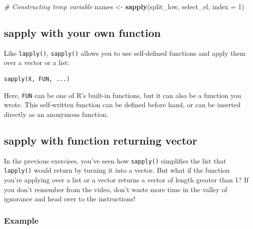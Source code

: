 \documentclass[
]{book}
\newenvironment{Shaded}{\begin{snugshade}}{\end{snugshade}}
\newcommand{\CommentTok}[1]{\textcolor[rgb]{0.56,0.35,0.01}{\textit{#1}}}
\newcommand{\DataTypeTok}[1]{\textcolor[rgb]{0.13,0.29,0.53}{#1}}
\newcommand{\DecValTok}[1]{\textcolor[rgb]{0.00,0.00,0.81}{#1}}
\newcommand{\KeywordTok}[1]{\textcolor[rgb]{0.13,0.29,0.53}{\textbf{#1}}}
\newcommand{\NormalTok}[1]{#1}
\newcommand{\StringTok}[1]{\textcolor[rgb]{0.31,0.60,0.02}{#1}}
\begin{document}
\begin{Shaded}
\begin{Highlighting}[]
\CommentTok{# Constructing temp variable}
\NormalTok{names <-}\StringTok{ }\KeywordTok{sapply}\NormalTok{(split_low, select_el, }\DataTypeTok{index =} \DecValTok{1}\NormalTok{)}
\end{Highlighting}
\end{Shaded}

\hypertarget{sapply-with-your-own-function}{%
\subsection{sapply with your own function}\label{sapply-with-your-own-function}}

Like \texttt{lapply()}, \texttt{sapply()} allows you to use self-defined functions and apply them over a vector or a list:

\begin{verbatim}
sapply(X, FUN, ...)
\end{verbatim}

Here, \texttt{FUN} can be one of R's built-in functions, but it can also be a function you wrote. This self-written function can be defined before hand, or can be inserted directly as an anonymous function.

\hypertarget{sapply-with-function-returning-vector}{%
\subsection{sapply with function returning vector}\label{sapply-with-function-returning-vector}}

In the previous exercises, you've seen how \texttt{sapply()} simplifies the list that \texttt{lapply()} would return by turning it into a vector. But what if the function you're applying over a list or a vector returns a vector of length greater than 1? If you don't remember from the video, don't waste more time in the valley of ignorance and head over to the instructions!

\hypertarget{example-5}{%
\subsubsection{Example}\label{example-5}}
\end{document}
